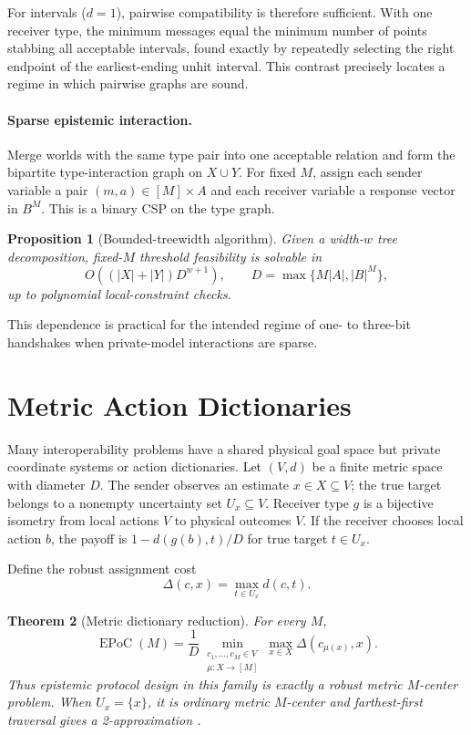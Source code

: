\documentclass[letterpaper]{article} %
\newtheorem{theorem}{Theorem}
\newtheorem{proposition}[theorem]{Proposition}
\newcommand{\EPoC}{\operatorname{EPoC}}
\begin{document}
For intervals ($d=1$), pairwise compatibility is therefore sufficient. With
one receiver type, the minimum messages equal the minimum number of points
stabbing all acceptable intervals, found exactly by repeatedly selecting the
right endpoint of the earliest-ending unhit interval. This contrast precisely
locates a regime in which pairwise graphs are sound.

\paragraph{Sparse epistemic interaction.}
Merge worlds with the same type pair into one acceptable relation and form the
bipartite type-interaction graph on $X\cup Y$. For fixed $M$, assign each sender
variable a pair $(m,a)\in[M]\times A$ and each receiver variable a response
vector in $B^M$. This is a binary CSP on the type graph.

\begin{proposition}[Bounded-treewidth algorithm]\label{prop:treewidth}
Given a width-$w$ tree decomposition, fixed-$M$ threshold feasibility is
solvable in
\[
O\!\left((|X|+|Y|)D^{w+1}\right),\qquad
D=\max\{M|A|,|B|^M\},
\]
up to polynomial local-constraint checks.
\end{proposition}

This dependence is practical for the intended regime of one- to three-bit
handshakes when private-model interactions are sparse.

\section{Metric Action Dictionaries}

Many interoperability problems have a shared physical goal space but private
coordinate systems or action dictionaries. Let $(V,d)$ be a finite metric
space with diameter $D$. The sender observes an estimate $x\in X\subseteq V$;
the true target belongs to a nonempty uncertainty set $U_x\subseteq V$.
Receiver type $g$ is a bijective isometry from local actions $V$ to physical
outcomes $V$. If the receiver chooses local action $b$, the payoff is
$1-d(g(b),t)/D$ for true target $t\in U_x$.

Define the robust assignment cost
\[
\Delta(c,x)=\max_{t\in U_x}d(c,t).
\]

\begin{theorem}[Metric dictionary reduction]\label{thm:metric}
For every $M$,
\[
\EPoC(M)=\frac{1}{D}
\min_{\substack{c_1,\ldots,c_M\in V\\
                   \mu:X\to[M]}}
\max_{x\in X}\Delta(c_{\mu(x)},x).
\]
Thus epistemic protocol design in this family is exactly a robust metric
$M$-center problem. When $U_x=\{x\}$, it is ordinary metric $M$-center and
farthest-first traversal gives a 2-approximation \citep{gonzalez1985clustering}.
\end{theorem}
\end{document}
